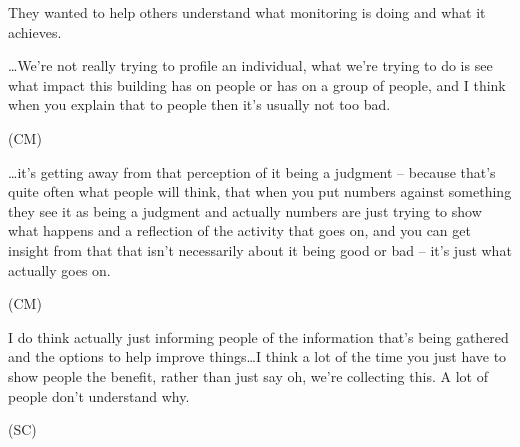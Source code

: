 They wanted to help others understand what monitoring is doing and
what it achieves.

\begin{qt} \ldots We’re not really
trying to profile an individual, what we’re trying to do is see what
impact this building has on people or has on a group of people, and I
think when you explain that to people then it’s usually not too bad.\end{qt}
(CM) 

\begin{qt}\ldots it’s getting away from that perception of it being a judgment –
because that’s quite often what people will think, that when you put
numbers against something they see it as being a judgment and actually
numbers are just trying to show what happens and a reflection of the
activity that goes on, and you can get insight from that that isn’t
necessarily about it being good or bad – it’s just what actually goes
on.\end{qt} (CM)

\begin{qt}I do think actually just informing people of the information that’s
being gathered and the options to help improve things\ldots I think a lot
of the time you just have to show people the benefit, rather than just
say oh, we’re collecting this. A lot of people don’t understand why.\end{qt}
(SC)





